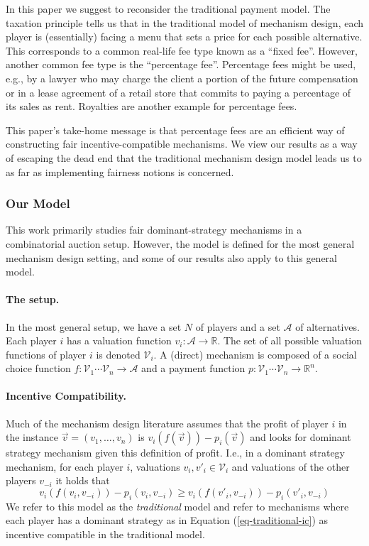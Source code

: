 \documentclass{article}
\newcommand{\cA}{{\mathcal A}}
\begin{document}
In this paper we suggest to reconsider the traditional payment model. The taxation principle tells us that in the traditional model of mechanism design, each player is (essentially) facing a menu that sets a price for each possible alternative. This corresponds to a common real-life fee type known as a ``fixed fee''. However, another common fee type is the ``percentage fee''. Percentage fees might be used, e.g., by a lawyer who may charge the client a portion of the future compensation or
in a lease agreement of a retail store that commits to paying a percentage of its sales as rent. Royalties are another example for percentage fees. 

This paper's take-home message is that percentage fees are an efficient way of constructing fair incentive-compatible mechanisms. We view our results as a way of escaping the dead end that the traditional mechanism design model leads us to as far as implementing fairness notions is concerned. 

\subsubsection*{Our Model}

This work primarily studies fair dominant-strategy mechanisms in a combinatorial auction setup. However, the model is defined for the most general mechanism design setting, and some of our results also apply to this general model.

\paragraph{The setup.} In the most general setup, we have a set $N$ of players and a set $\cA$ of alternatives. Each player $i$ has a valuation function $v_i:\mathcal A \rightarrow \mathbb R$. The set of all possible valuation functions of player $i$ is denoted $\mathcal V_i$. A (direct) mechanism is composed of a social choice function $f:\mathcal V_1 \cdots \mathcal V_n\rightarrow \mathcal A$ and a payment function $p:\mathcal V_1 \cdots \mathcal V_n\rightarrow \mathbb R^n$. 

\paragraph{Incentive Compatibility.} Much of the mechanism design literature assumes that the profit of player $i$ in the instance $\overrightarrow v=(v_1,\ldots, v_n)$ is $v_i(f(\overrightarrow v))-p_i(\overrightarrow v)$ and looks for dominant strategy mechanism given this definition of profit. I.e., in a dominant strategy mechanism, for each player $i$, valuations $v_i,v'_i\in \mathcal V_i$ and valuations of the other players $v_{-i}$ it holds that
\begin{equation}\label{eq-traditional-ic}
v_i(f(v_i,v_{-i}))-p_i(v_i,v_{-i}) \geq v_i(f(v'_i,v_{-i}))-p_i(v'_i,v_{-i})
\end{equation}
We refer to this model as the \emph{traditional} model and refer to mechanisms where each player has a dominant strategy as in Equation (\ref{eq-traditional-ic}) as incentive compatible in the traditional model.
\end{document}
